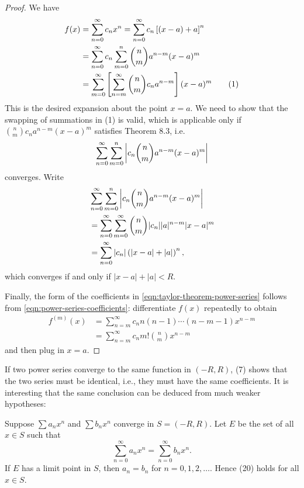 \begin{proof}
We have
\begin{align*}
f(x)&=\sum_{n=0}^{\infty}c_nx^n
=\sum_{n=0}^{\infty}c_n\left[(x-a)+a\right]^n\\
&=\sum_{n=0}^{\infty}c_n\sum_{m=0}^{n}\binom{n}{m}a^{n-m}(x-a)^m\\
&=\sum_{m=0}^{\infty}\left[\sum_{n=m}^{\infty}\binom{n}{m}c_n a^{n-m}\right](x-a)^m\tag{1}
\end{align*}
This is the desired expansion about the point $x=a$. We need to show that the swapping of summations in (1) is valid, which is applicable only if $\binom{n}{m}c_n a^{n-m}(x-a)^m$ satisfies Theorem 8.3, i.e.
\[\sum_{n=0}^{\infty}\sum_{m=0}^{n}\left|c_n\binom{n}{m}a^{n-m}(x-a)^m\right|\]
converges. Write
\begin{align*}
&\sum_{n=0}^{\infty}\sum_{m=0}^{n}\left|c_n\binom{n}{m}a^{n-m}(x-a)^m\right|\\
&=\sum_{n=0}^{\infty}\sum_{m=0}^{\infty}\binom{n}{m}|c_n||a|^{n-m}|x-a|^m\\
&=\sum_{n=0}^{\infty}|c_n|\left(|x-a|+|a|\right)^n,
\end{align*}
which converges if and only if $|x-a|+|a|<R$.

Finally, the form of the coefficients in \eqref{eqn:taylor-theorem-power-series} follows from \eqref{eqn:power-series-coefficients}: differentiate $f(x)$ repeatedly to obtain
\begin{align*}
f^{(m)}(x)
&=\sum_{n=m}^{\infty}c_n n(n-1)\cdots(n-m-1)x^{n-m}\\
&=\sum_{n=m}^{\infty}c_n m!\binom{n}{m}x^{n-m}
\end{align*}
and then plug in $x=a$.
\end{proof}

If two power series converge to the same function in $(-R,R)$, (7) shows that the two series must be identical, i.e., they must have the same coefficients. It is interesting that the same conclusion can be deduced from much weaker hypotheses: 

\begin{proposition}
Suppose $\sum a_nx^n$ and $\sum b_nx^n$ converge in $S=(-R,R)$. Let $E$ be the set of all $x\in S$ such that
\[\sum_{n=0}^{\infty}a_nx^n=\sum_{n=0}^{\infty}b_nx^n.\]
If $E$ has a limit point in $S$, then $a_n=b_n$ for $n=0,1,2,\dots$. Hence (20) holds for all $x\in S$. 
\end{proposition}

